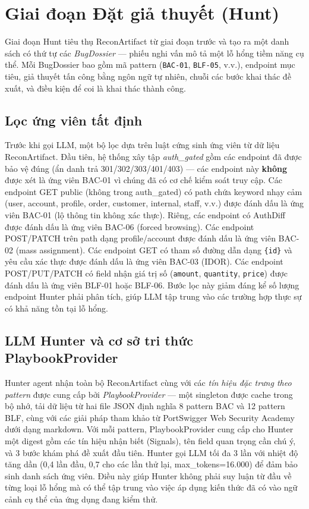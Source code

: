 \section{Giai đoạn Đặt giả thuyết (Hunt)}

Giai đoạn Hunt tiêu thụ ReconArtifact từ giai đoạn trước và tạo ra một danh sách có thứ tự các \textit{BugDossier} --- phiếu nghi vấn mô tả một lỗ hổng tiềm năng cụ thể. Mỗi BugDossier bao gồm mã pattern (\texttt{BAC-01}, \texttt{BLF-05}, v.v.), endpoint mục tiêu, giả thuyết tấn công bằng ngôn ngữ tự nhiên, chuỗi các bước khai thác đề xuất, và điều kiện để coi là khai thác thành công.

\subsection{Lọc ứng viên tất định}

Trước khi gọi LLM, một bộ lọc dựa trên luật cứng sinh ứng viên từ dữ liệu ReconArtifact. Đầu tiên, hệ thống xây tập \textit{auth\_gated} gồm các endpoint đã được bảo vệ đúng (ẩn danh trả 301/302/303/401/403) --- các endpoint này \textbf{không} được xét là ứng viên BAC-01 vì chúng đã có cơ chế kiểm soát truy cập. Các endpoint GET public (không trong auth\_gated) có path chứa keyword nhạy cảm (user, account, profile, order, customer, internal, staff, v.v.) được đánh dấu là ứng viên BAC-01 (lộ thông tin không xác thực). Riêng, các endpoint có AuthDiff được đánh dấu là ứng viên BAC-06 (forced browsing). Các endpoint POST/PATCH trên path dạng profile/account được đánh dấu là ứng viên BAC-02 (mass assignment). Các endpoint GET có tham số đường dẫn dạng \texttt{\{id\}} và yêu cầu xác thực được đánh dấu là ứng viên BAC-03 (IDOR). Các endpoint POST/PUT/PATCH có field nhận giá trị số (\texttt{amount}, \texttt{quantity}, \texttt{price}) được đánh dấu là ứng viên BLF-01 hoặc BLF-06. Bước lọc này giảm đáng kể số lượng endpoint Hunter phải phân tích, giúp LLM tập trung vào các trường hợp thực sự có khả năng tồn tại lỗ hổng.

\subsection{LLM Hunter và cơ sở tri thức PlaybookProvider}

Hunter agent nhận toàn bộ ReconArtifact cùng với các \textit{tín hiệu đặc trưng theo pattern} được cung cấp bởi \textit{PlaybookProvider} --- một singleton được cache trong bộ nhớ, tải dữ liệu từ hai file JSON định nghĩa 8 pattern BAC và 12 pattern BLF, cùng với các giải pháp tham khảo từ PortSwigger Web Security Academy dưới dạng markdown. Với mỗi pattern, PlaybookProvider cung cấp cho Hunter một digest gồm các tín hiệu nhận biết (Signals), tên field quan trọng cần chú ý, và 3 bước khám phá đề xuất đầu tiên. Hunter gọi LLM tối đa 3 lần với nhiệt độ tăng dần (0,4 lần đầu, 0,7 cho các lần thử lại, max\_tokens=16.000) để đảm bảo sinh danh sách ứng viên. Điều này giúp Hunter không phải suy luận từ đầu về từng loại lỗ hổng mà có thể tập trung vào việc áp dụng kiến thức đã có vào ngữ cảnh cụ thể của ứng dụng đang kiểm thử.

